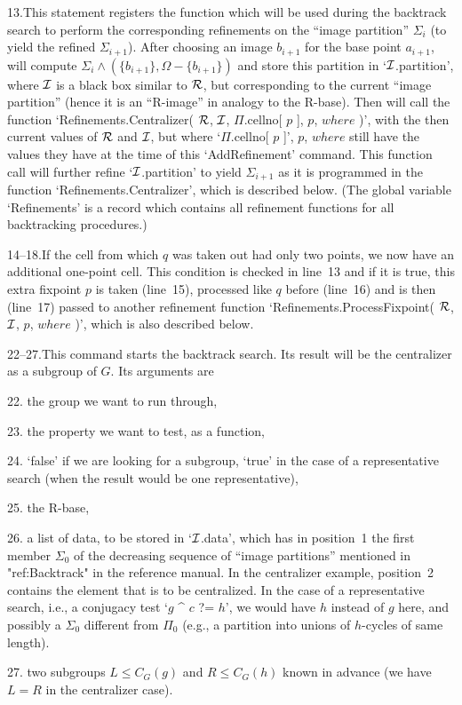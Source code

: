 13.\enspace  This statement registers  the   function which will be  used
during the  backtrack search to perform  the corresponding refinements on
the ``image partition'' $\Sigma_i$ (to yield the refined $\Sigma_{i+1}$).
After choosing an image  $b_{i+1}$ for the  base point $a_{i+1}$,  {\GAP}
will compute $\Sigma_i \wedge (\{b_{i+1}\},\Omega-\{b_{i+1}\})$ and store
this partition in `${\cal I}$.partition', where ${\cal I}$  is a black box similar to
${\cal R}$, but  corresponding to the current  ``image partition'' (hence it is
an   ``R-image'' in analogy  to the  R-base). Then {\GAP}   will call the
function `Refinements.Centralizer( ${\cal R}$, ${\cal I}$,  $\Pi$.cellno[ $p$ ], $p$,
$where$  )',  with the  then current values  of ${\cal R}$  and ${\cal I}$, but where
`$\Pi$.cellno[ $p$ ]',  $p$, $where$ still  have the values they  have at
the time of this `AddRefinement' command. This function call will further
refine  `${\cal I}$.partition' to yield $\Sigma_{i+1}$ as  it  is programmed in
the function `Refinements.Centralizer',  which  is described  below. (The
global  variable `Refinements' is  a record which contains all refinement
functions for all backtracking procedures.)

14--18.\enspace If  the cell from which  $q$ was taken  out  had only two
points, we   now have an   additional one-point  cell. This  condition is
checked  in line~13 and if it  is true, this  extra fixpoint $p$ is taken
(line~15), processed like $q$  before   (line~16) and is then   (line~17)
passed to another refinement function `Refinements.ProcessFixpoint( ${\cal R}$,
${\cal I}$, $p$, $where$ )', which is also described below.

22--27.\enspace This command starts the backtrack search. Its result will
be the centralizer as a subgroup of $G$. Its arguments are
\beginlist
  \item{22.} the group we want to run through,
  \item{23.} the property we want to test, as a {\GAP} function,
  \item{24.} `false' if we are looking for a subgroup, `true' in the case
    of   a  representative  search    (when  the result   would    be one
    representative),
  \item{25.} the R-base,
  \item{26.} a list  of data, to be stored  in `${\cal I}$.data', which has
    in position~1 the first member $\Sigma_0$  of the decreasing sequence
    of ``image partitions'' mentioned in "ref:Backtrack" in the
    reference manual. In the centralizer example, position~2 contains the
    element that is  to be centralized. In the  case of  a representative
    search,  i.e.,  a conjugacy test  `$g$  ^ $c$ ?= $h$', we
    would  have $h$   instead of  $g$   here, and   possibly a $\Sigma_0$
    different from $\Pi_0$ (e.g., a  partition into unions of  $h$-cycles
    of same length).
  \item{27.} two subgroups  $L\le  C_G(g)$  and  $R\le  C_G(h)$ known  in
    advance (we have $L=R$ in the centralizer case).
\endlist

